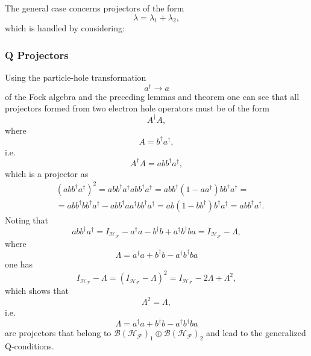\documentclass[aps,preprint]{revtex4}%
\begin{document}
The general case concerns projectors of the form
\begin{equation}
\lambda=\lambda_{1}+\lambda_{2},
\end{equation}
which is handled by considering:

\subsubsection{Q Projectors}

Using the particle-hole transformation
\begin{equation}
a^{\dagger}\rightarrow a
\end{equation}
of the Fock algebra and the preceding lemmas and theorem one can see that all
projectors formed from two electron hole operators must be of the form%
\begin{equation}
A^{\dagger}A,
\end{equation}
where
\begin{equation}
A=b^{\dagger}a^{\dagger},
\end{equation}
i.e.%
\begin{equation}
A^{\dagger}A=abb^{\dagger}a^{\dagger},
\end{equation}
which is a projector as
\begin{align}
&  \left(  abb^{\dagger}a^{\dagger}\right)  ^{2}=abb^{\dagger}a^{\dagger
}abb^{\dagger}a^{\dagger}=abb^{\dagger}\left(  1-aa^{\dagger}\right)
bb^{\dagger}a^{\dagger}=\nonumber\\
&  =abb^{\dagger}bb^{\dagger}a^{\dagger}-abb^{\dagger}aa^{\dagger}bb^{\dagger
}a^{\dagger}=ab\left(  1-bb^{\dagger}\right)  b^{\dagger}a^{\dagger
}=abb^{\dagger}a^{\dagger}.
\end{align}
Noting that
\begin{equation}
abb^{\dagger}a^{\dagger}=I_{\mathcal{H}_{\mathcal{F}}}-a^{\dagger}%
a-b^{\dagger}b+a^{\dagger}b^{\dagger}ba=I_{\mathcal{H}_{\mathcal{F}}}-\Lambda,
\end{equation}
where
\begin{equation}
\Lambda=a^{\dagger}a+b^{\dagger}b-a^{\dagger}b^{\dagger}ba
\end{equation}
one has
\begin{equation}
I_{\mathcal{H}_{\mathcal{F}}}-\Lambda=\left(  I_{\mathcal{H}_{\mathcal{F}}%
}-\Lambda\right)  ^{2}=I_{\mathcal{H}_{\mathcal{F}}}-2\Lambda+\Lambda^{2},
\end{equation}
which shows that
\begin{equation}
\Lambda^{2}=\Lambda,
\end{equation}
i.e.
\begin{equation}
\Lambda=a^{\dagger}a+b^{\dagger}b-a^{\dagger}b^{\dagger}ba
\end{equation}
are projectors that belong to $\mathcal{B}\left(  \mathcal{H}_{\mathcal{F}%
}\right)  _{1}\oplus\mathcal{B}\left(  \mathcal{H}_{\mathcal{F}}\right)  _{2}$
and lead to the generalized Q-conditions.
\end{document}
